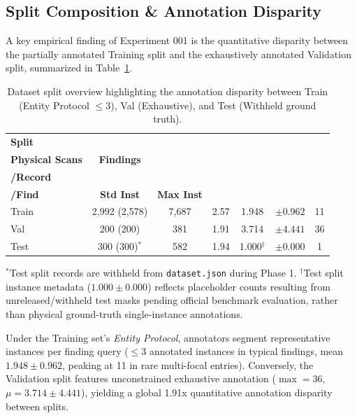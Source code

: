 \documentclass[11pt,a4paper]{article}
\begin{document}
\subsection{Split Composition \& Annotation Disparity}
A key empirical finding of Experiment 001 is the quantitative disparity between the partially annotated Training split and the exhaustively annotated Validation split, summarized in Table~\ref{tab:split_summary}.

\begin{table}[htbp]
\centering
\caption{Dataset split overview highlighting the annotation disparity between Train (Entity Protocol $\le 3$), Val (Exhaustive), and Test (Withheld ground truth).}
\label{tab:split_summary}
\footnotesize
\setlength{\tabcolsep}{6pt}
\begin{tabular}{lcccccc}
\toprule
\textbf{Split} & \makecell{\textbf{Records /}\\\textbf{Physical Scans}} & \textbf{Findings} & \makecell{\textbf{Findings}\\\textbf{/Record}} & \makecell{\textbf{Mean Inst}\\\textbf{/Find}} & \textbf{Std Inst} & \textbf{Max Inst} \\
\midrule
Train & 2,992 (2,578) & 7,687 & 2.57 & 1.948 & $\pm 0.962$ & 11 \\
Val   & 200 (200)     & 381   & 1.91 & 3.714 & $\pm 4.441$ & 36 \\
Test  & 300 (300)$^*$ & 582   & 1.94 & 1.000$^\dagger$ & $\pm 0.000$ & 1 \\
\bottomrule
\end{tabular}

\vspace{2mm}
\raggedright \footnotesize $^*$Test split records are withheld from \texttt{dataset.json} during Phase 1. $^\dagger$Test split instance metadata ($1.000 \pm 0.000$) reflects placeholder counts resulting from unreleased/withheld test masks pending official benchmark evaluation, rather than physical ground-truth single-instance annotations.
\end{table}

Under the Training set's \textit{Entity Protocol}, annotators segment representative instances per finding query ($\le 3$ annotated instances in typical findings, mean $1.948 \pm 0.962$, peaking at 11 in rare multi-focal entries). Conversely, the Validation split features unconstrained exhaustive annotation ($\max=36$, $\mu=3.714 \pm 4.441$), yielding a global 1.91x quantitative annotation disparity between splits.
\end{document}
